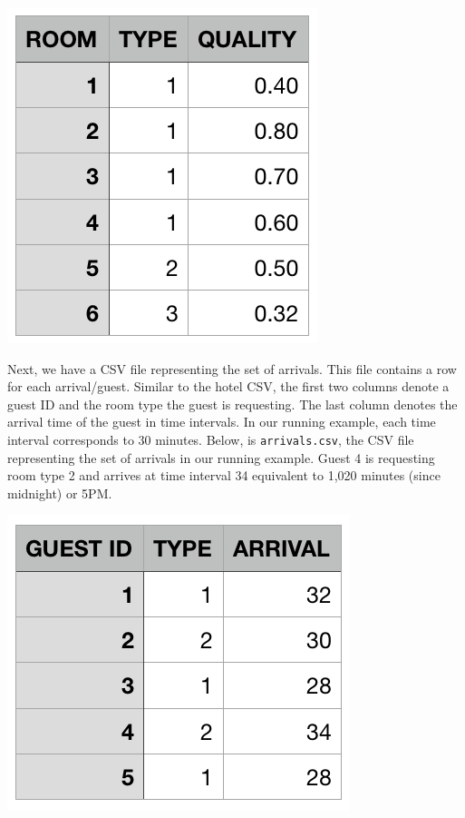 \documentclass[11 pt]{article}
\begin{document}
\begin{center}
\includegraphics[scale=0.7]{images/roomsCSV.png}
\end{center}
\par Next, we have a CSV file representing the set of arrivals. This file contains a row for each arrival/guest. Similar to the hotel CSV, the first two columns denote a guest ID and the room type the guest is requesting. The last column denotes the arrival time of the guest in time intervals. In our running example, each time interval corresponds to 30 minutes. Below, is \texttt{arrivals.csv}, the CSV file representing the set of arrivals in our running example. Guest 4 is requesting room type 2 and arrives at time interval 34 equivalent to 1,020 minutes (since midnight) or 5PM. 
\begin{center}
\includegraphics[scale=0.7]{images/arrivalsCSV.png}
\end{center}
\end{document}
